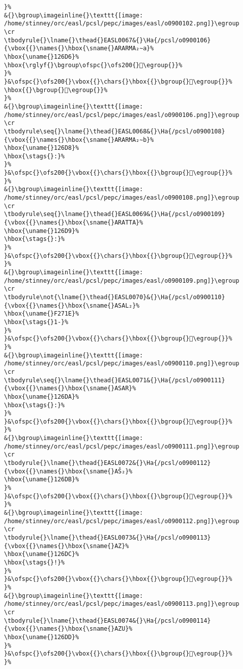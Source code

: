 \begin{verbatim}
}%
&{}\bgroup\imageinline{}\texttt{[image: /home/stinney/orc/easl/pcsl/pepc/images/easl/o0900102.png]}\egroup
\cr
\tbodyrule{}\lname{}\thead{}EASL0067&{}\Ha{/pcsl/o0900106}{\vbox{{}\names{}\hbox{\sname{}ARARMA₂∼a}%
\hbox{\uname{}126D6}%
\hbox{\rglyf{}\bgroup\ofspc{}\ofs200{}𒛖\egroup{}}%
}%
}&\ofspc{}\ofs200{}\vbox{{}\chars{}\hbox{{}\bgroup{}𒛗\egroup{}}%
\hbox{{}\bgroup{}𒛖\egroup{}}%
}%
&{}\bgroup\imageinline{}\texttt{[image: /home/stinney/orc/easl/pcsl/pepc/images/easl/o0900106.png]}\egroup
\cr
\tbodyrule\seq{}\lname{}\thead{}EASL0068&{}\Ha{/pcsl/o0900108}{\vbox{{}\names{}\hbox{\sname{}ARARMA₂∼b}%
\hbox{\uname{}126D8}%
\hbox{\stags{}:}%
}%
}&\ofspc{}\ofs200{}\vbox{{}\chars{}\hbox{{}\bgroup{}𒛘\egroup{}}%
}%
&{}\bgroup\imageinline{}\texttt{[image: /home/stinney/orc/easl/pcsl/pepc/images/easl/o0900108.png]}\egroup
\cr
\tbodyrule\seq{}\lname{}\thead{}EASL0069&{}\Ha{/pcsl/o0900109}{\vbox{{}\names{}\hbox{\sname{}ARATTA}%
\hbox{\uname{}126D9}%
\hbox{\stags{}:}%
}%
}&\ofspc{}\ofs200{}\vbox{{}\chars{}\hbox{{}\bgroup{}𒛙\egroup{}}%
}%
&{}\bgroup\imageinline{}\texttt{[image: /home/stinney/orc/easl/pcsl/pepc/images/easl/o0900109.png]}\egroup
\cr
\tbodyrule\not{\lname{}\thead{}EASL0070}&{}\Ha{/pcsl/o0900110}{\vbox{{}\names{}\hbox{\sname{}ASAL₂}%
\hbox{\uname{}F271E}%
\hbox{\stags{}1-}%
}%
}&\ofspc{}\ofs200{}\vbox{{}\chars{}\hbox{{}\bgroup{}󲜞\egroup{}}%
}%
&{}\bgroup\imageinline{}\texttt{[image: /home/stinney/orc/easl/pcsl/pepc/images/easl/o0900110.png]}\egroup
\cr
\tbodyrule\seq{}\lname{}\thead{}EASL0071&{}\Ha{/pcsl/o0900111}{\vbox{{}\names{}\hbox{\sname{}ASAR}%
\hbox{\uname{}126DA}%
\hbox{\stags{}:}%
}%
}&\ofspc{}\ofs200{}\vbox{{}\chars{}\hbox{{}\bgroup{}𒛚\egroup{}}%
}%
&{}\bgroup\imageinline{}\texttt{[image: /home/stinney/orc/easl/pcsl/pepc/images/easl/o0900111.png]}\egroup
\cr
\tbodyrule{}\lname{}\thead{}EASL0072&{}\Ha{/pcsl/o0900112}{\vbox{{}\names{}\hbox{\sname{}AŠ₂}%
\hbox{\uname{}126DB}%
}%
}&\ofspc{}\ofs200{}\vbox{{}\chars{}\hbox{{}\bgroup{}𒛛\egroup{}}%
}%
&{}\bgroup\imageinline{}\texttt{[image: /home/stinney/orc/easl/pcsl/pepc/images/easl/o0900112.png]}\egroup
\cr
\tbodyrule{}\lname{}\thead{}EASL0073&{}\Ha{/pcsl/o0900113}{\vbox{{}\names{}\hbox{\sname{}AZ}%
\hbox{\uname{}126DC}%
\hbox{\stags{}!}%
}%
}&\ofspc{}\ofs200{}\vbox{{}\chars{}\hbox{{}\bgroup{}𒛜\egroup{}}%
}%
&{}\bgroup\imageinline{}\texttt{[image: /home/stinney/orc/easl/pcsl/pepc/images/easl/o0900113.png]}\egroup
\cr
\tbodyrule{}\lname{}\thead{}EASL0074&{}\Ha{/pcsl/o0900114}{\vbox{{}\names{}\hbox{\sname{}AZU}%
\hbox{\uname{}126DD}%
}%
}&\ofspc{}\ofs200{}\vbox{{}\chars{}\hbox{{}\bgroup{}𒛝\egroup{}}%
}%

\end{verbatim}
